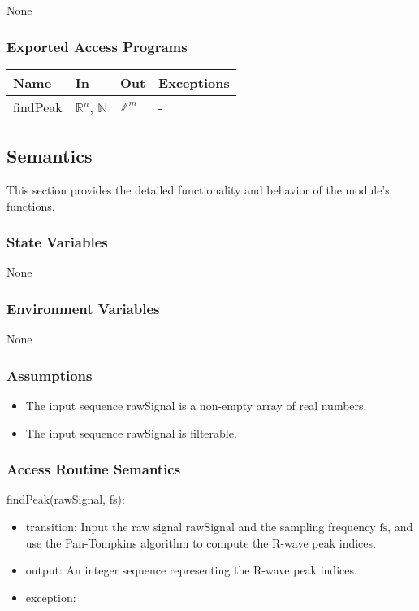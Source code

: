 \documentclass[12pt, titlepage]{article}
\begin{document}
None

\subsubsection{Exported Access Programs}

\begin{center}
\begin{tabular}{p{2cm} p{4cm} p{4cm} p{2cm}}
\hline
\textbf{Name} & \textbf{In} & \textbf{Out} & \textbf{Exceptions} \\
\hline
findPeak & $\mathbb{R}^n$, $\mathbb{N}$ & $\mathbb{Z}^m$ & - \\
\hline
\end{tabular}
\end{center}

\subsection{Semantics}

This section provides the detailed functionality and behavior of the module’s
functions.

\subsubsection{State Variables}

None

\subsubsection{Environment Variables}

None

\subsubsection{Assumptions}

\begin{itemize}
\item The input sequence rawSignal is a non-empty array of real numbers.
\item The input sequence rawSignal is filterable.
\end{itemize}

\subsubsection{Access Routine Semantics}

\noindent findPeak(rawSignal, fs):
\begin{itemize}
\item transition: Input the raw signal $\text{rawSignal}$ and the sampling
frequency $\text{fs}$, and use the Pan-Tompkins algorithm to compute the R-wave
peak indices.
\item output: An integer sequence representing the R-wave peak indices.
\item exception: 
\end{itemize}
\end{document}
